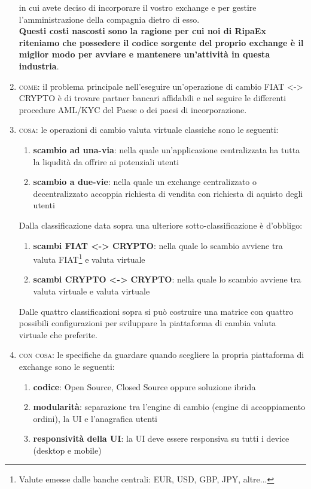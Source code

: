 \documentclass[11pt,fleqn,oneside]{book} %
\begin{document}
\begin{enumerate}
	in cui avete deciso di incorporare il vostro exchange e per gestire l'amministrazione della compagnia dietro di esso.\\
	\textbf{Questi costi nascosti sono la ragione per cui noi di RipaEx riteniamo che possedere il codice sorgente del proprio exchange è il miglior
	modo per avviare e mantenere un'attività in questa industria}.
	\item \textsc{come}: il problema principale nell'eseguire un'operazione di cambio FIAT <-> CRYPTO è di trovare partner bancari affidabili
	e nel seguire le differenti procedure AML/KYC del Paese o dei paesi di incorporazione.
	\item \textsc{cosa}: le operazioni di cambio valuta virtuale classiche sono le seguenti:
		\begin{enumerate}[label*=\arabic*.]
			\item \textbf{scambio ad una-via}: nella quale un'applicazione centralizzata ha tutta la liqudità da offrire ai potenziali utenti
			\item \textbf{scambio a due-vie}: nella quale un exchange centralizzato o decentralizzato accoppia richiesta di vendita con richiesta di aquisto degli utenti
		\end{enumerate}
		Dalla classificazione data sopra una ulteriore sotto-classificazione è d'obbligo:
		\begin{enumerate}[label*=\arabic*.]
			\item \textbf{scambi FIAT <-> CRYPTO}: nella quale lo scambio avviene tra valuta FIAT\footnote{Valute emesse dalle banche centrali: EUR, USD, GBP, JPY, altre...}
			e valuta virtuale
			\item \textbf{scambi CRYPTO <-> CRYPTO}: nella quale lo scambio avviene tra valuta virtuale e valuta virtuale
		\end{enumerate}
	Dalle quattro classificazioni sopra si può costruire una matrice con quattro possibili configurazioni per sviluppare la piattaforma di cambia valuta virtuale
	che preferite.
	\item \textsc{con cosa}: le specifiche da guardare quando scegliere la propria piattaforma di exchange sono le seguenti: 
		\begin{enumerate}[label*=\arabic*.]
			\item \textbf{codice}: Open Source, Closed Source oppure soluzione ibrida
			\item \textbf{modularità}: separazione tra l'engine di cambio (engine di accoppiamento ordini), la UI e l'anagrafica utenti
			\item \textbf{responsività della UI}: la UI deve essere responsiva su tutti i device (desktop e mobile)

\end{enumerate}
\end{enumerate}
\end{document}
